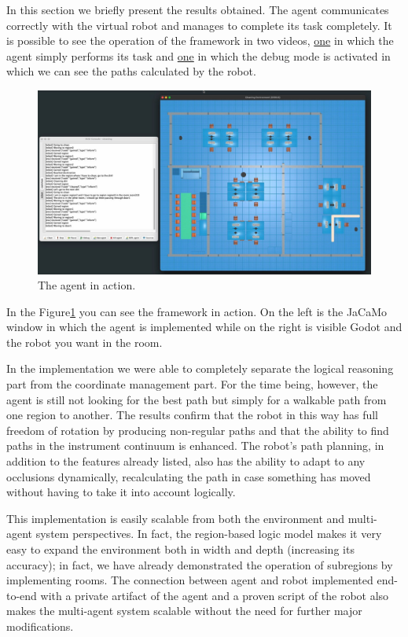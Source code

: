 \label{sec:results}
In this section we briefly present the results obtained.
The agent communicates correctly with the virtual robot and manages to complete its task completely.
It is possible to see the operation of the framework in two videos, \href{https://youtu.be/dQbiNx36fNs}{one} in which the agent simply performs its task and \href{https://youtu.be/iuQfDgS0oUE}{one} in which the debug mode is activated in which we can see the paths calculated by the robot.

\begin{figure}
    \centering
    \includegraphics[width=\textwidth]{sections/imgs/screen.jpeg}
    \caption{The agent in action.}
    \label{fig:screen}
\end{figure}
In the Figure\ref{fig:screen} you can see the framework in action.
On the left is the JaCaMo window in which the agent is implemented while on the right is visible Godot and the robot you want in the room.

In the implementation we were able to completely separate the logical reasoning part from the coordinate management part.
For the time being, however, the agent is still not looking for the best path but simply for a walkable path from one region to another.
The results confirm that the robot in this way has full freedom of rotation by producing non-regular paths and that the ability to find paths in the instrument continuum is enhanced.
The robot's path planning, in addition to the features already listed, also has the ability to adapt to any occlusions dynamically, recalculating the path in case something has moved without having to take it into account logically.

This implementation is easily scalable from both the environment and multi-agent system perspectives.
In fact, the region-based logic model makes it very easy to expand the environment both in width and depth (increasing its accuracy); in fact, we have already demonstrated the operation of subregions by implementing rooms.
The connection between agent and robot implemented end-to-end with a private artifact of the agent and a proven script of the robot also makes the multi-agent system scalable without the need for further major modifications.